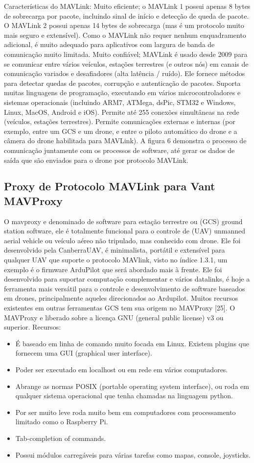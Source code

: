 Características do MAVLink:
Muito eficiente; o MAVLink 1 possui apenas 8 bytes de sobrecarga por pacote, incluindo sinal de início e detecção de queda de pacote. O MAVLink 2 possui apenas 14 bytes de sobrecarga (mas é um protocolo muito mais seguro e extensível). Como o MAVLink não requer nenhum enquadramento adicional, é muito adequado para aplicativos com largura de banda de comunicação muito limitada.
Muito confiável;  MAVLink é usado desde 2009 para se comunicar entre vários veículos, estações terrestres (e outros nós) em canais de comunicação variados e desafiadores (alta latência / ruído). Ele fornece métodos para detectar quedas de pacotes, corrupção e autenticação de pacotes.
Suporta muitas linguagens de programação, executando em vários microcontroladores e sistemas operacionais (incluindo ARM7, ATMega, dsPic, STM32 e Windows, Linux, MacOS, Android e iOS).
Permite até 255 conexões simultâneas na rede (veículos, estações terrestres).
Permite comunicações externas e internas (por exemplo, entre um GCS e um drone, e entre o piloto automático do drone e a câmera do drone habilitada para MAVLink). A figura 6 demonstra o processo de comunicação juntamente com os processos de software, até gerar os dados de saída que são enviados para o drone por protocolo MAVLink.

\subsection{Proxy de Protocolo MAVLink para Vant MAVProxy}
O mavproxy e denominado de software para estação terrestre ou (GCS) ground station software, ele é totalmente funcional para o controle de (UAV) unmanned aerial vehicle ou veículo aéreo não tripulado, mas conhecido com drone. Ele foi desenvolvido pela CanberraUAV, é minimalista, portátil e extensível para qualquer UAV que suporte o protocolo MAVlink, visto no índice 1.3.1, um exemplo é o firmware ArduPilot que será abordado mais à frente. Ele foi desenvolvido para suportar computação complementar e vários datalinks, é hoje a ferramenta mais versátil para o controle e desenvolvimento de software baseados em drones, principalmente aqueles direcionados ao Ardupilot. Muitos recursos existentes em outras ferramentas GCS tem sua origem no MAVProxy [25]. O MAVProxy e liberado sobre a licença GNU (general public license) v3 ou superior.
Recursos:
\begin{itemize}
    \item É baseado em linha de comando muito focada em Linux. Existem plugins que fornecem uma GUI (graphical user interface).
    \item Poder ser executado em localhost ou em rede em vários computadores.
    \item Abrange as normas POSIX (portable operating system interface), ou roda em qualquer sistema operacional que tenha chamadas na linguagem python.
    \item Por ser muito leve roda muito bem em computadores com processamento limitado como o Raspberry Pi.
    \item Tab-completion of commands.
    \item Possui módulos carregáveis para várias tarefas como mapas, console, joysticks.
\end{itemize}
